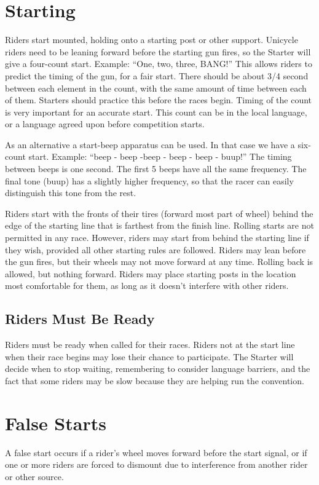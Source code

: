 \section{Starting}
Riders start mounted, holding onto a starting post or other support.
Unicycle riders need to be leaning forward before the starting gun fires, so the Starter will give a four-count start.
Example: ``One, two, three, BANG!''
This allows riders to predict the timing of the gun, for a fair start.
There should be about 3/4 second between each element in the count, with the same amount of time between each of them.
Starters should practice this before the races begin.
Timing of the count is very important for an accurate start.
This count can be in the local language, or a language agreed upon before competition starts.

As an alternative a start-beep apparatus can be used.
In that case we have a six-count start.
Example: ``beep - beep -beep - beep - beep - buup!''
The timing between beeps is one second.
The first 5 beeps have all the same frequency.
The final tone (buup) has a slightly higher frequency, so that the racer can easily distinguish this tone from the rest.

Riders start with the fronts of their tires (forward most part of wheel) behind the edge of the starting line that is farthest from the finish line.
Rolling starts are not permitted in any race.
However, riders may start from behind the starting line if they wish, provided all other starting rules are followed.
Riders may lean before the gun fires, but their wheels may not move forward at any time.
Rolling back is allowed, but nothing forward.
Riders may place starting posts in the location most comfortable for them, as long as it doesn't interfere with other riders.

\subsection{Riders Must Be Ready}
Riders must be ready when called for their races.
Riders not at the start line when their race begins may lose their chance to participate.
The Starter will decide when to stop waiting, remembering to consider language barriers, and the fact that some riders may be slow because they are helping run the convention.

\section{False Starts}
A false start occurs if a rider's wheel moves forward before the start signal, or if one or more riders are forced to dismount due to interference from another rider or other source.

